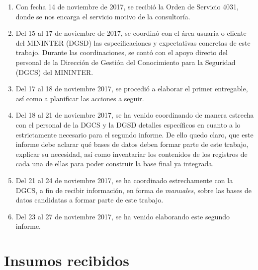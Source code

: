 \documentclass[a4paper,12pt]{texMemo}
\begin{document}
\begin{enumerate}
\item Con fecha 14 de noviembre de 2017, se recibió la Orden de Servicio 4031, donde se nos encarga el servicio motivo de la consultoría.

\item Del 15 al 17 de noviembre de 2017, se coordinó con el área usuaria o cliente del MININTER (DGSD) las especificaciones y expectativas concretas de este trabajo. Durante las coordinaciones, se contó con el apoyo directo del personal de la Dirección de Gestión del Conocimiento para la Seguridad (DGCS) del MININTER.

\item Del 17 al 18 de noviembre 2017, se procedió a elaborar el primer entregable, así como a planificar las acciones a seguir.

\item Del 18 al 21 de noviembre 2017, se ha venido coordinando de manera estrecha con el personal de la DGCS y la DGSD detalles específicos en cuanto a lo estrictamente necesario para el segundo informe. De ello quedo claro, que este informe debe aclarar qué bases de datos deben formar parte de este trabajo, explicar su necesidad, así como inventariar los contenidos de los registros de cada una de ellas para poder construir la base final ya integrada.

\item Del 21 al 24 de noviembre 2017, se ha coordinado estrechamente con la DGCS, a fin de recibir información, en forma de \emph{manuales}, sobre las bases de datos candidatas a formar parte de este trabajo.

\item Del 23 al 27 de noviembre 2017, se ha venido elaborando este segundo informe.

\end{enumerate}

\section{Insumos recibidos}
\end{document}
